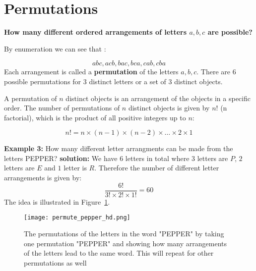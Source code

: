 \section{Permutations}

\textbf{How many different ordered arrangements of letters \(a,b,c\) are possible?}

By enumeration we can see that : 

\[
abc, acb, bac, bca, cab, cba
\]
Each arrangement is called a \textbf{permutation} of the letters \(a,b,c\). There are \(6\) possible permutations for \(3\) distinct letters or a set of \(3\) distinct objects.

\begin{definitionboxbreak}{}
    A permutation of \(n\) distinct objects is an arrangement of the objects in a specific order. The number of permutations of \(n\) distinct objects is given by \(n!\) (n factorial), which is the product of all positive integers up to \(n\):
    
    \[
    n! = n \times (n-1) \times (n-2) \times \ldots \times 2 \times 1
    \]
\end{definitionboxbreak} 


\begin{exampleboxbreak}{}
    \textbf{Example 3:} How many different letter arrangments can be made from the letters PEPPER?
        \textbf{solution:} We have \(6\) letters in total where \(3\) letters are \(P\), \(2\) letters are \(E\) and \(1\) letter is \(R\). Therefore the number of different letter arrangements is given by:
        \[ \frac{6!}{3! \times 2! \times 1!} = 60 \]
        The idea is illustrated in Figure~\ref{fig:permute_pepper}.
\end{exampleboxbreak}

\begin{figure}[H!]
    \centering
    \texttt{[image: permute\_pepper\_hd.png]}
    \caption{The permutations of the letters in the word "PEPPER" by taking one permutation "PEPPER" and showing how many arrangements of the letters lead to the same word. This will repeat for other permutations as well}
    \label{fig:permute_pepper}
\end{figure}


